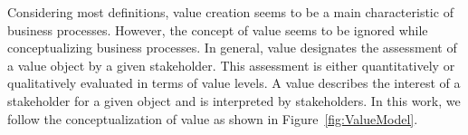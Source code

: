 \documentclass[preprint,3p,times,number]{elsarticle}
\begin{document}
Considering most definitions, value creation seems to be a main characteristic of business processes. However, the concept of value seems to be ignored while conceptualizing business processes. In general, value designates the assessment of a value object by a given stakeholder. This assessment is either quantitatively or qualitatively evaluated in terms of value levels. A value describes the interest of a stakeholder for a given object and is interpreted by stakeholders. In this work, we follow the conceptualization of value as shown in Figure~\ref{fig:ValueModel}.

\newcommand\insertbprimsymbol[2][2cm]{%
  \raisebox{\dimexpr1.2em-\totalheight}{\texttt{[image: figures/\#2]}}%
}
\newcommand\insertbprimrelation[2][.8em]{%
  \raisebox{\dimexpr#1-\totalheight}{\texttt{[image: figures/\#2]}}%
}
\end{document}
